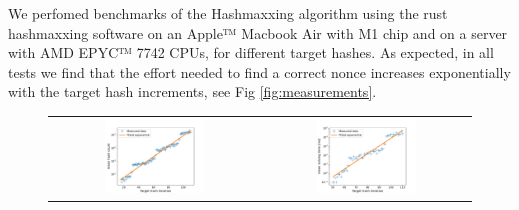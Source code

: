 \documentclass[12pt, a4paper]{article}
\begin{document}
We perfomed benchmarks of the Hashmaxxing algorithm using the rust hashmaxxing software on an Apple™ Macbook Air with M1 chip and on a server with AMD EPYC™ 7742 CPUs, for different target hashes. As expected, in all tests we find that the effort needed to find a correct nonce increases exponentially with the target hash increments, see Fig \ref{fig:measurements}.
\newcommand{\thisfigurewidth}{0.5}
\begin{figure}[H]
    \centering
    \begin{tabular}{cc}
      \includegraphics[width=\thisfigurewidth\textwidth]{figures/m1_hashcount.pdf} & 
      \includegraphics[width=\thisfigurewidth\textwidth]{figures/m1_solving_time.pdf} \\

\end{tabular}
\end{figure}
\end{document}
